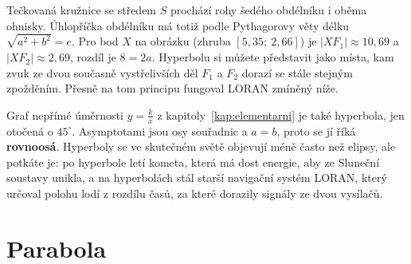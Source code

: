\begin{center}
\end{center}
Tečkovaná kružnice se středem $S$ prochází rohy šedého obdélníku i oběma ohnisky. Úhlopříčka obdélníku má totiž podle Pythagorovy věty délku $\sqrt{a^2 + b^2} = e$. Pro bod $X$ na obrázku (zhruba $[5{,}35;\ 2{,}66]$) je $|XF_1|\approx 10{,}69$ a $|XF_2|\approx 2{,}69$, rozdíl je $8 = 2a$. Hyperbolu si můžete představit jako místa, kam zvuk ze dvou současně vystřelivších děl $F_1$ a $F_2$ dorazí se stále stejným zpožděním. Přesně na tom principu fungoval LORAN zmíněný níže.

\begin{note}
  Graf nepřímé úměrnosti $y = \frac{k}{x}$ z kapitoly~\ref{kap:elementarni} je také hyperbola, jen otočená o $45^\circ$. Asymptotami jsou osy souřadnic a $a = b$, proto se jí říká \textbf{rovnoosá}. Hyperboly se ve skutečném světě objevují méně často než elipsy, ale potkáte je: po hyperbole letí kometa, která má dost energie, aby ze Sluneční soustavy unikla, a na hyperbolách stál starší navigační systém LORAN, který určoval polohu lodí z rozdílu časů, za které dorazily signály ze dvou vysílačů.
\end{note}

\section{Parabola}\label{sec:parabola}

